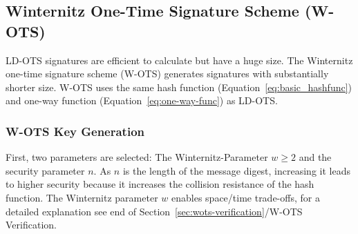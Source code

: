 
\subsection{Winternitz One-Time Signature Scheme (W-OTS)}
\label{sec:wots_general}
LD-OTS signatures are efficient to calculate but have a huge size. %
The Winternitz one-time signature scheme (W-OTS) generates signatures with substantially shorter size. W-OTS uses the same hash function (Equation~\ref{eq:basic_hashfunc}) and one-way function (Equation~\ref{eq:one-way-func}) as LD-OTS. %

\subsubsection{W-OTS Key Generation}
\label{sec:WOTS_keygen}
First, two parameters are selected: The Winternitz-Parameter $w \geq 2$ and the security parameter $n$. As $n$ is the length of the message digest, increasing it leads to higher security because it increases the collision resistance of the hash function. The Winternitz parameter $w$ enables space/time trade-offs, for a detailed explanation see end of Section~\ref{sec:wots-verification}/W-OTS Verification.

